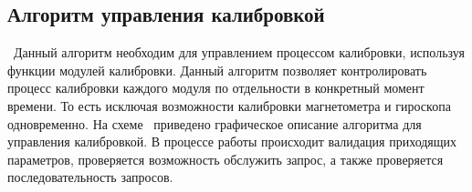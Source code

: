 
\subsection{Алгоритм управления калибровкой}
\blockScheme\
Данный алгоритм необходим для управлением процессом калибровки, используя функции модулей калибровки. Данный алгоритм позволяет контролировать
процесс калибровки каждого модуля по отдельности в конкретный момент времени. То есть исключая возможности калибровки магнетометра и гироскопа
одновременно. На схеме \blockScheme\ приведено графическое описание алгоритма для управления калибровкой. В процессе работы происходит валидация
приходящих параметров, проверяется возможность обслужить запрос, а также проверяется последовательность запросов.

